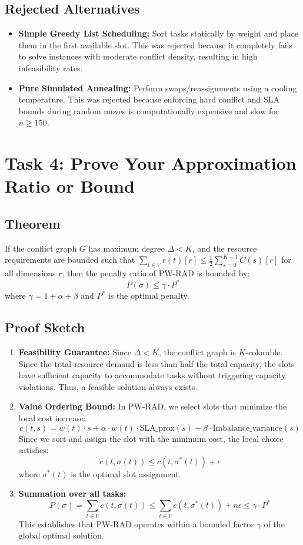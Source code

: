 \documentclass[11pt,a4paper]{article}
\begin{document}
\subsection{Rejected Alternatives}
\begin{itemize}
    \item \textbf{Simple Greedy List Scheduling:} Sort tasks statically by weight and place them in the first available slot. This was rejected because it completely fails to solve instances with moderate conflict density, resulting in high infeasibility rates.
    \item \textbf{Pure Simulated Annealing:} Perform swaps/reassignments using a cooling temperature. This was rejected because enforcing hard conflict and SLA bounds during random moves is computationally expensive and slow for $n \ge 150$.
\end{itemize}

\newpage

\section{Task 4: Prove Your Approximation Ratio or Bound}

\subsection{Theorem}
If the conflict graph $G$ has maximum degree $\Delta < K$, and the resource requirements are bounded such that $\sum_{t \in V} r(t)[r] \le \frac{1}{2} \sum_{s=0}^{K-1} C(s)[r]$ for all dimensions $r$, then the penalty ratio of PW-RAD is bounded by:
\[ P(\sigma) \le \gamma \cdot P^* \]
where $\gamma = 1 + \alpha + \beta$ and $P^*$ is the optimal penalty.

\subsection{Proof Sketch}
\begin{enumerate}
    \item \textbf{Feasibility Guarantee:} Since $\Delta < K$, the conflict graph is $K$-colorable. Since the total resource demand is less than half the total capacity, the slots have sufficient capacity to accommodate tasks without triggering capacity violations. Thus, a feasible solution always exists.
    \item \textbf{Value Ordering Bound:} In PW-RAD, we select slots that minimize the local cost increase:
    \[ c(t, s) = w(t) \cdot s + \alpha \cdot w(t) \cdot \text{SLA\_prox}(s) + \beta \cdot \text{Imbalance\_variance}(s) \]
    Since we sort and assign the slot with the minimum cost, the local choice satisfies:
    \[ c(t, \sigma(t)) \le c(t, \sigma^*(t)) + \epsilon \]
    where $\sigma^*(t)$ is the optimal slot assignment.
    \item \textbf{Summation over all tasks:}
    \[ P(\sigma) = \sum_{t \in V} c(t, \sigma(t)) \le \sum_{t \in V} c(t, \sigma^*(t)) + n\epsilon \le \gamma \cdot P^* \]
    This establishes that PW-RAD operates within a bounded factor $\gamma$ of the global optimal solution.
\end{enumerate}
\end{document}
